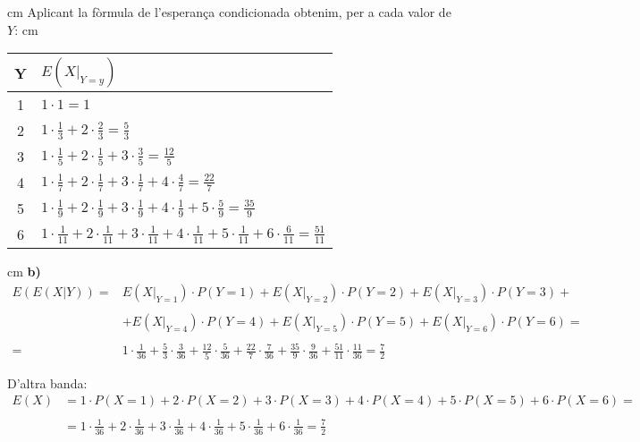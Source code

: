 \documentclass{article}
\begin{document}
 cm
\noindent
Aplicant la f\`ormula de l'esperan\c{c}a condicionada obtenim, per a cada valor de $Y$:
 cm
\begin{center}
\begin{tabular}{c|l|}
Y & $E(X|_{Y=y})$ \\ \hline
1 & $1 \cdot 1 = 1$ \\ \hline 
2 & $1 \cdot \frac{1}{3} + 2 \cdot \frac{2}{3}=\frac{5}{3}$ \\ \hline
3 & $1 \cdot \frac{1}{5} + 2 \cdot \frac{1}{5} + 3 \cdot \frac{3}{5} =\frac{12}{5}$ \\ \hline
4 & $1 \cdot \frac{1}{7} + 2 \cdot \frac{1}{7} + 3 \cdot \frac{1}{7} + 4 \cdot \frac{4}{7} =\frac{22}{7}$ \\ \hline
5 & $1 \cdot \frac{1}{9} + 2 \cdot \frac{1}{9} + 3 \cdot \frac{1}{9} + 4 \cdot \frac{1}{9} + 5 \cdot \frac{5}{9} =\frac{35}{9}$ \\ \hline
6 & $1 \cdot \frac{1}{11} + 2 \cdot \frac{1}{11} + 3 \cdot \frac{1}{11} + 4 \cdot \frac{1}{11} + 5 \cdot \frac{1}{11} 
+ 6 \cdot \frac{6}{11} =\frac{51}{11}$ \\ \hline
\end{tabular}
\end{center}

 cm
\noindent
\textbf{b)} 
\[
\begin{array}{rl}
E(E(X|Y)) = & E(X|_{Y=1}) \cdot P(Y=1) + E(X|_{Y=2}) \cdot P(Y=2) + E(X|_{Y=3}) \cdot P(Y=3) + \\ \\
 & + E(X|_{Y=4}) \cdot P(Y=4) + E(X|_{Y=5}) \cdot P(Y=5) + E(X|_{Y=6}) \cdot P(Y=6) = \\ \\
 = & 1 \cdot \frac{1}{36} + \frac{5}{3} \cdot \frac{3}{36} + \frac{12}{5} \cdot \frac{5}{36} + \frac{22}{7} \cdot \frac{7}{36}
 + \frac{35}{9} \cdot \frac{9}{36} + \frac{51}{11} \cdot \frac{11}{36} = \frac{7}{2}
\end{array}
\]

\noindent
D'altra banda:
\[
\begin{array}{rl}
E(X) & = 1 \cdot P(X=1) + 2 \cdot P(X=2) + 3 \cdot P(X=3) + 4 \cdot P(X=4) + 5 \cdot P(X=5) + 6 \cdot P(X=6) = \\ \\
 & = 1 \cdot \frac{1}{36} + 2 \cdot \frac{1}{36} + 3 \cdot \frac{1}{36} + 4 \cdot \frac{1}{36} + 5 \cdot \frac{1}{36} + 6 \cdot \frac{1}{36} =
\frac{7}{2}
\end{array}
\]
\end{document}
